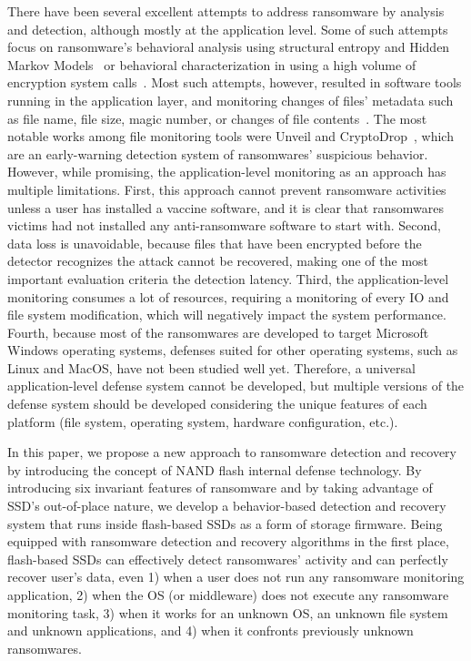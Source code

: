 \documentclass[conference]{IEEEtran}
\begin{document}
There have been several excellent  attempts to address ransomware by analysis and detection, although mostly at the application level.  Some of such attempts focus on
ransomware's behavioral analysis using structural entropy and Hidden Markov
Models~\cite{canfora16} or behavioral characterization in using a high volume of encryption
system calls~\cite{andronio15}.  Most  such attempts, however, resulted in
software tools running in the application layer, and monitoring changes
of files' metadata such as file name, file size, magic number, or
changes of file contents~\cite{scaife16,andronio15,kim94}.  The
most notable works among file monitoring tools were Unveil and
CryptoDrop~\cite{scaife16,kharaz}, which are an early-warning
detection system of ransomwares' suspicious behavior.  However, while promising, the
application-level monitoring as an approach has multiple limitations. First, this approach cannot
prevent ransomware activities unless a user has installed a vaccine
software, and it is clear that  ransomwares victims  had not installed any anti-ransomware software to start with. Second, data loss is
unavoidable, because files that have been encrypted before the
detector recognizes the attack cannot be recovered, making one of
the most important evaluation criteria the detection latency.  Third, 
the application-level monitoring consumes a lot of resources, requiring a monitoring of every IO and file system modification, which will negatively impact the system performance. Fourth, because most of the ransomwares are developed to target Microsoft
Windows operating systems, defenses suited for other
operating systems, such as Linux and MacOS, have not been studied
well yet.  Therefore, a universal application-level defense
system cannot be developed, but multiple versions of the defense
system should be developed considering the unique features of each
platform (file system, operating system, hardware configuration,
etc.).  

In this paper, we propose a new approach to ransomware detection
and recovery by introducing the concept of NAND flash internal
defense technology.  By introducing six invariant features of
ransomware and by taking advantage of SSD's out-of-place nature, we
develop a behavior-based detection and recovery system that runs
inside flash-based SSDs as a form of storage firmware.  Being
equipped with ransomware detection and recovery algorithms in the
first place, flash-based SSDs can effectively detect ransomwares'
activity and can perfectly recover user's data, even
1) when a user does not run any ransomware monitoring application,
2) when the OS (or middleware) does not execute any ransomware monitoring task,
3) when it works for an unknown OS, an unknown file system and unknown applications, and
4) when it confronts previously unknown ransomwares.
\end{document}
